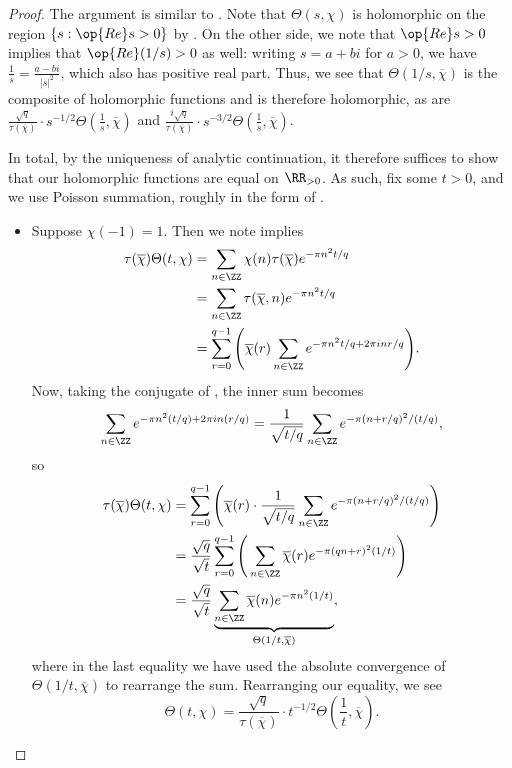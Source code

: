 \documentclass[../notes.tex]{subfiles}
\begin{document}
\begin{proof}
	The argument is similar to . Note that $\Theta(s,\chi)$ is holomorphic on the region $\{s:\op{Re}s>0\}$ by . On the other side, we note that $\op{Re}s>0$ implies that $\op{Re}(1/s)>0$ as well: writing $s=a+bi$ for $a>0$, we have $\frac1s=\frac{a-bi}{|s|^2}$, which also has positive real part. Thus, we see that $\Theta(1/s,\overline\chi)$ is the composite of holomorphic functions and is therefore holomorphic, as are $\frac{\sqrt{q}}{\tau(\overline\chi)}\cdot s^{-1/2}\Theta\left(\frac1s,\overline\chi\right)$ and $\frac{i\sqrt{q}}{\tau(\overline\chi)}\cdot s^{-3/2}\Theta\left(\frac1s,\overline\chi\right)$.

	In total, by the uniqueness of analytic continuation, it therefore suffices to show that our holomorphic functions are equal on $\RR_{>0}$. As such, fix some $t>0$, and we use Poisson summation, roughly in the form of .
	\begin{itemize}
		\item Suppose $\chi(-1)=1$. Then we note  implies
		\begin{align*}
			\tau(\overline\chi)\Theta(t,\chi) &= \sum_{n\in\ZZ}\chi(n)\tau(\overline\chi)e^{-\pi n^2t/q} \\
			&= \sum_{n\in\ZZ}\tau(\overline\chi,n)e^{-\pi n^2t/q} \\
			&= \sum_{r=0}^{q-1}\Bigg(\overline\chi(r)\sum_{n\in\ZZ}e^{-\pi n^2t/q+2\pi inr/q}\Bigg).
		\end{align*}
		Now, taking the conjugate of , the inner sum becomes
		\[\sum_{n\in\ZZ}e^{-\pi n^2(t/q)+2\pi in(r/q)}=\frac1{\sqrt{t/q}}\sum_{n\in\ZZ}e^{-\pi(n+r/q)^2/(t/q)},\]
		so
		\begin{align*}
			\tau(\overline\chi)\Theta(t,\chi) &= \sum_{r=0}^{q-1}\Bigg(\overline\chi(r)\cdot\frac1{\sqrt{t/q}}\sum_{n\in\ZZ}e^{-\pi(n+r/q)^2/(t/q)}\Bigg) \\
			&= \frac{\sqrt q}{\sqrt t}\sum_{r=0}^{q-1}\Bigg(\sum_{n\in\ZZ}\overline\chi(r)e^{-\pi(qn+r)^2(1/t)}\Bigg) \\
			&= \frac{\sqrt q}{\sqrt t}\underbrace{\sum_{n\in\ZZ}\overline\chi(n)e^{-\pi n^2(1/t)}}_{\Theta(1/t,\overline\chi)},
		\end{align*}
		where in the last equality we have used the absolute convergence of $\Theta(1/t,\overline\chi)$ to rearrange the sum. Rearranging our equality, we see
		\[\Theta(t,\chi)=\frac{\sqrt{q}}{\tau(\overline\chi)}\cdot t^{-1/2}\Theta\left(\frac1t,\overline\chi\right).\]

\end{itemize}
\end{proof}
\end{document}
